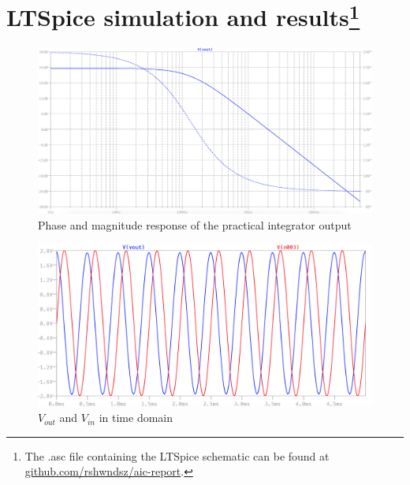 \documentclass[12pt, titlepage]{article}
\theoremstyle{definition}
\begin{document}
  \newpage
  \section[LTSpice simulation and results]{LTSpice simulation and results\footnote{The .asc file containing the LTSpice schematic can be found at \href{https://github.com/rshwndsz/aic-report/blob/master/lab5.asc}{github.com/rshwndsz/aic-report}.}}


    \begin{figure}[h]
      \centering
      \includegraphics[scale=0.3]{sim_plot_fd}
      \caption{Phase and magnitude response of the practical integrator output}
    \end{figure}
    \begin{figure}[h]
      \centering
      \includegraphics[scale=0.5]{sim_plot_td}
      \caption{$V_{out}$ and $V_{in}$ in time domain}
    \end{figure}
\end{document}
